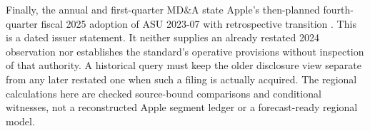 Finally, the annual and first-quarter MD\&A state Apple's then-planned
fourth-quarter fiscal 2025 adoption of ASU 2023-07 with retrospective
transition \citep[Recent Accounting Pronouncements]{apple2024,apple2025q1}.
This is a dated issuer statement. It neither supplies an already restated
2024 observation nor establishes the standard's operative provisions without
inspection of that authority. A historical query must keep the older
disclosure view separate from any later restated one when such a filing is
actually acquired. The regional calculations here are checked source-bound
comparisons and conditional witnesses, not a reconstructed Apple segment
ledger or a forecast-ready regional model.
